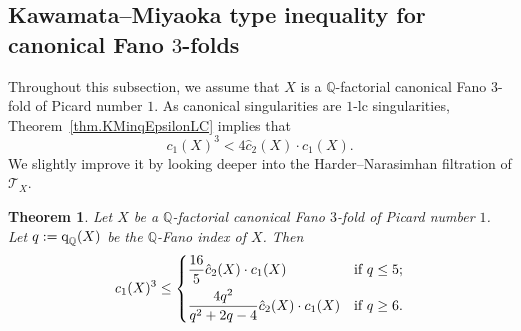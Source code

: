 \documentclass[12pt,twoside]{amsart}
\newcommand{\qQ}{\text{\rm q}_{\mathbb{Q}}}
\newtheorem{thm}{Theorem}[section]
\theoremstyle{definition}
\begin{document}
\subsection{Kawamata--Miyaoka type inequality for canonical Fano $3$-folds}

Throughout this subsection, we assume that $X$ is a $\mathbb{Q}$-factorial canonical Fano $3$-fold of Picard number $1$. As canonical singularities are $1$-lc singularities, Theorem~\ref{thm.KMinqEpsilonLC} implies that 
\[c_1(X)^3 < 4\hat{c}_2(X) \cdot c_1(X).\]
We slightly improve it by looking deeper into the Harder--Narasimhan filtration of $\mathcal{T}_X$.
	
\begin{thm}\label{thm.kmineqfor3fold}
 Let $X$ be a $\mathbb{Q}$-factorial canonical Fano $3$-fold of Picard number $1$. Let $q:=\qQ(X)$ be the $\mathbb{Q}$-Fano index of $X$. Then
 \[
 c_1(X)^3 \leq 
 \begin{dcases}
 \frac{16}{5} \hat{c}_2(X)\cdot c_1(X) & \text{if } q\leq 5;\\
 \frac{4q^2}{q^2 + 2q -4} \hat{c}_2(X)\cdot c_1(X)& \text{if } q\geq 6.
 \end{dcases}
 \]
\end{thm}
	
\end{document}
